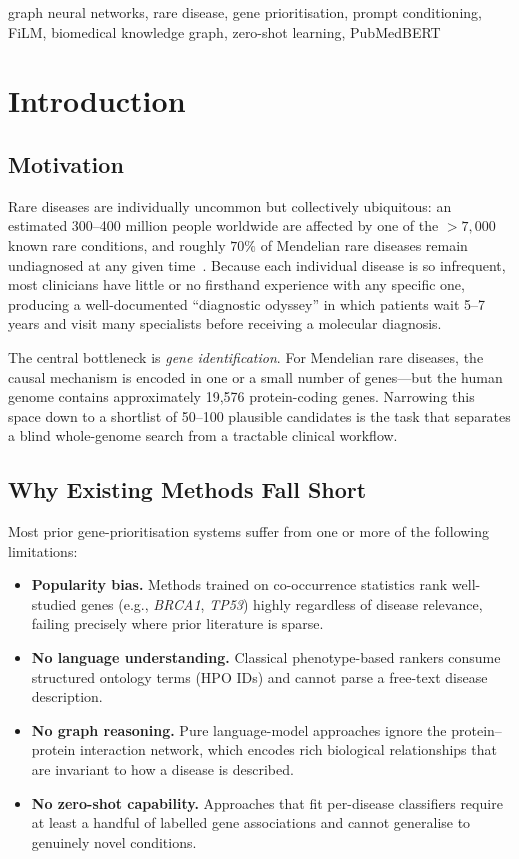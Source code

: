 \documentclass[conference]{IEEEtran}
\begin{document}
\begin{IEEEkeywords}
graph neural networks, rare disease, gene prioritisation, prompt conditioning, FiLM, biomedical knowledge graph, zero-shot learning, PubMedBERT
\end{IEEEkeywords}

\section{Introduction}
\label{sec:intro}

\subsection{Motivation}
Rare diseases are individually uncommon but collectively ubiquitous: an estimated 300--400 million people worldwide are affected by one of the $>\!\!7{,}000$ known rare conditions, and roughly $70\%$ of Mendelian rare diseases remain undiagnosed at any given time~\cite{shepherd2025}. Because each individual disease is so infrequent, most clinicians have little or no firsthand experience with any specific one, producing a well-documented ``diagnostic odyssey'' in which patients wait 5--7 years and visit many specialists before receiving a molecular diagnosis.

The central bottleneck is \emph{gene identification}. For Mendelian rare diseases, the causal mechanism is encoded in one or a small number of genes---but the human genome contains approximately 19{,}576 protein-coding genes. Narrowing this space down to a shortlist of 50--100 plausible candidates is the task that separates a blind whole-genome search from a tractable clinical workflow.

\subsection{Why Existing Methods Fall Short}
Most prior gene-prioritisation systems suffer from one or more of the following limitations:
\begin{itemize}
    \item \textbf{Popularity bias.} Methods trained on co-occurrence statistics rank well-studied genes (e.g., \emph{BRCA1}, \emph{TP53}) highly regardless of disease relevance, failing precisely where prior literature is sparse.
    \item \textbf{No language understanding.} Classical phenotype-based rankers consume structured ontology terms (HPO IDs) and cannot parse a free-text disease description.
    \item \textbf{No graph reasoning.} Pure language-model approaches ignore the protein--protein interaction network, which encodes rich biological relationships that are invariant to how a disease is described.
    \item \textbf{No zero-shot capability.} Approaches that fit per-disease classifiers require at least a handful of labelled gene associations and cannot generalise to genuinely novel conditions.
\end{itemize}
\end{document}
